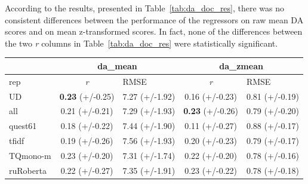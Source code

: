 According to the results, presented in Table~\ref{tab:da_doc_res}, there was no consistent differences between the performance of the regressors on raw mean DA scores and on mean z-transformed scores. In fact, none of the differences between the two \textit{r} columns in Table~\ref{tab:da_doc_res} were statistically significant.

\begin{table}[H]
	\centering
	\begin{tabular}{l|cl|cl}
		\toprule
		& \multicolumn{2}{c|}{da\_mean} & \multicolumn{2}{c}{da\_zmean} \\
		\midrule
		rep             & \textit{r}         & RMSE & \textit{r}          & RMSE \\
		\midrule
            UD        & \textbf{0.23} (+/-0.25) & 7.27 (+/-1.92) & 0.16 (+/-0.23) & 0.81 (+/-0.19) \\
			all       & 0.21 (+/-0.21) & 7.29 (+/-1.93) & \textbf{0.23} (+/-0.26) & 0.79 (+/-0.20) \\
			quest61   & 0.18 (+/-0.22) & 7.44 (+/-1.90) & 0.11 (+/-0.27) & 0.88 (+/-0.17) \\
			\midrule
			tfidf     & 0.19 (+/-0.26) & 7.56 (+/-1.93) & 0.20 (+/-0.23) & 0.79 (+/-0.17) \\
			TQmono-m  & 0.23 (+/-0.20) & 7.31 (+/-1.74) & 0.22 (+/-0.20) & 0.78 (+/-0.16) \\
			ruRoberta & 0.22 (+/-0.27) & 7.35 (+/-1.91) & 0.23 (+/-0.22) & 0.78 (+/-0.18) \\

\end{tabular}
\end{table}
